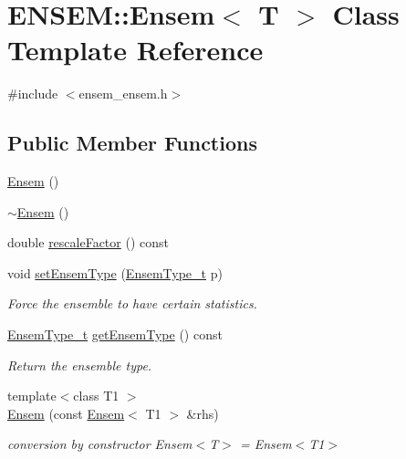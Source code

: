 \hypertarget{classENSEM_1_1Ensem}{}\section{E\+N\+S\+EM\+:\+:Ensem$<$ T $>$ Class Template Reference}
\label{classENSEM_1_1Ensem}


{\ttfamily \#include $<$ensem\+\_\+ensem.\+h$>$}

\subsection*{Public Member Functions}
\begin{DoxyCompactItemize}
\item 
\mbox{\hyperlink{classENSEM_1_1Ensem_a8875b85c5536f02d10db536a815984b6}{Ensem}} ()
\item 
\mbox{\hyperlink{classENSEM_1_1Ensem_a01e4e19b101048ad2ffcf886017592c9}{$\sim$\+Ensem}} ()
\item 
double \mbox{\hyperlink{classENSEM_1_1Ensem_aecf90199daafa73454e9c1aceef313a4}{rescale\+Factor}} () const
\item 
void \mbox{\hyperlink{classENSEM_1_1Ensem_a5fdfac362fd4347e4383b4e0a8537aec}{set\+Ensem\+Type}} (\mbox{\hyperlink{namespaceENSEM_a2dc2c4a26884f343471e52f23479ddbe}{Ensem\+Type\+\_\+t}} p)
\begin{DoxyCompactList}\small\item\em Force the ensemble to have certain statistics. \end{DoxyCompactList}\item 
\mbox{\hyperlink{namespaceENSEM_a2dc2c4a26884f343471e52f23479ddbe}{Ensem\+Type\+\_\+t}} \mbox{\hyperlink{classENSEM_1_1Ensem_aa2cfc665852c06f9b058a1a2233d249e}{get\+Ensem\+Type}} () const
\begin{DoxyCompactList}\small\item\em Return the ensemble type. \end{DoxyCompactList}\item 
{\footnotesize template$<$class T1 $>$ }\\\mbox{\hyperlink{classENSEM_1_1Ensem_ab0e04ebf09af997fb7f1477cdc48145b}{Ensem}} (const \mbox{\hyperlink{classENSEM_1_1Ensem}{Ensem}}$<$ T1 $>$ \&rhs)
\begin{DoxyCompactList}\small\item\em conversion by constructor Ensem$<$\+T$>$ = Ensem$<$\+T1$>$ \end{DoxyCompactList}\item 

\end{DoxyCompactItemize}
